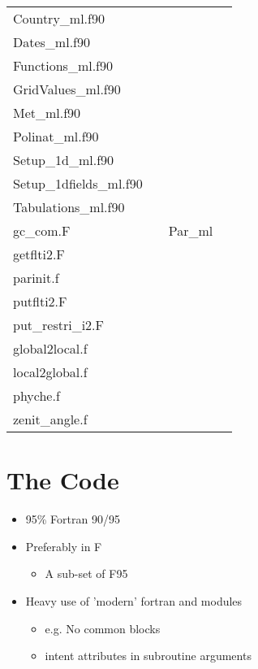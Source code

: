 \begin{small}
\begin{table}
\begin{tabular}{|llll|}
Country\_ml.f90 &  &   &  \\
Dates\_ml.f90 &  &   &  \\
Functions\_ml.f90 &  &   &  \\
GridValues\_ml.f90 &  &   &  \\
Met\_ml.f90 &  &   &  \\
Polinat\_ml.f90 &  &   &  \\
Setup\_1d\_ml.f90 &  &   &  \\
Setup\_1dfields\_ml.f90 &  &   &  \\
Tabulations\_ml.f90 &  &   &  \\
\hline
gc\_com.F &  & Par\_ml   &  \\
getflti2.F &  &   &  \\
parinit.f &  &   &  \\
putflti2.F &  &   &  \\
put\_restri\_i2.F &  &   &  \\
\hline
global2local.f &  &   &  \\
local2global.f &  &   &  \\
phyche.f &  &   &  \\
zenit\_angle.f &  &   &  \\
\hline
\end{tabular}
\end{table}
\end{small}



\chapter{The Code}



\begin{itemize}
\item
95\% Fortran 90/95

\item
Preferably in F
   \begin{itemize}
      \item
        A sub-set of F95
   \end{itemize}

\item
   Heavy use of 'modern' fortran and modules
   \begin{itemize}
      \item
        e.g. No common blocks
      \item
        intent attributes  in subroutine arguments
   \end{itemize}
\end{itemize}

